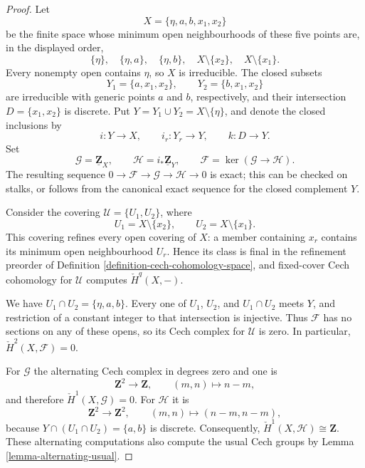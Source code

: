 \begin{proof}
Let
$$
X = \{\eta, a, b, x_1, x_2\}
$$
be the finite space whose minimum open neighbourhoods of these five points
are, in the displayed order,
$$
\{\eta\},\quad \{\eta, a\},\quad \{\eta, b\},\quad
X \setminus \{x_2\},\quad X \setminus \{x_1\}.
$$
Every nonempty open contains $\eta$, so $X$ is irreducible. The closed
subsets
$$
Y_1 = \{a, x_1, x_2\}, \qquad
Y_2 = \{b, x_1, x_2\}
$$
are irreducible with generic points $a$ and $b$, respectively, and their
intersection $D = \{x_1, x_2\}$ is discrete. Put
$Y = Y_1 \cup Y_2 = X \setminus \{\eta\}$, and denote the closed
inclusions by
$$
i : Y \longrightarrow X, \qquad
i_r : Y_r \longrightarrow Y, \qquad
k : D \longrightarrow Y.
$$
Set
$$
\mathcal{G} = \underline{\mathbf{Z}}_X, \qquad
\mathcal{H} = i_*\underline{\mathbf{Z}}_Y, \qquad
\mathcal{F} = \ker(\mathcal{G} \longrightarrow \mathcal{H}).
$$
The resulting sequence $0 \to \mathcal{F} \to \mathcal{G} \to
\mathcal{H} \to 0$ is exact; this can be checked on stalks, or follows
from the canonical exact sequence for the closed complement $Y$.

Consider the covering $\mathcal{U} = \{U_1, U_2\}$, where
$$
U_1 = X \setminus \{x_2\}, \qquad
U_2 = X \setminus \{x_1\}.
$$
This covering refines every open covering of $X$: a member containing
$x_r$ contains its minimum open neighbourhood $U_r$. Hence its class is
final in the refinement preorder of
Definition \ref{definition-cech-cohomology-space}, and fixed-cover Cech
cohomology for $\mathcal{U}$ computes $\check{H}^q(X, -)$.

We have $U_1 \cap U_2 = \{\eta, a, b\}$. Every one of
$U_1$, $U_2$, and $U_1 \cap U_2$ meets $Y$, and restriction of a constant
integer to that intersection is injective. Thus $\mathcal{F}$ has no
sections on any of these opens, so its Cech complex for $\mathcal{U}$ is
zero. In particular, $\check{H}^2(X, \mathcal{F}) = 0$.

For $\mathcal{G}$ the alternating Cech complex in degrees zero and one is
$$
\mathbf{Z}^2 \longrightarrow \mathbf{Z}, \qquad
(m, n) \longmapsto n - m,
$$
and therefore $\check{H}^1(X, \mathcal{G}) = 0$. For $\mathcal{H}$ it is
$$
\mathbf{Z}^2 \longrightarrow \mathbf{Z}^2, \qquad
(m, n) \longmapsto (n - m, n - m),
$$
because $Y \cap (U_1 \cap U_2) = \{a, b\}$ is discrete. Consequently,
$\check{H}^1(X, \mathcal{H}) \cong \mathbf{Z}$. These alternating
computations also compute the usual Cech groups by
Lemma \ref{lemma-alternating-usual}.


\end{proof}
